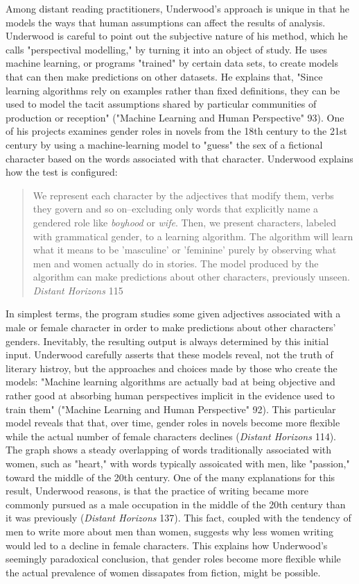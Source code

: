 \documentclass[11pt]{article}
\begin{document}
Among distant reading practitioners, Underwood's approach is unique in
that he models the ways that human assumptions can affect the results
of analysis. Underwood is careful to point out the subjective nature
of his method, which he calls "perspectival modelling," by turning it
into an object of study. He uses machine learning, or programs
"trained" by certain data sets, to create models that can then make
predictions on other datasets. He explains that, "Since learning
algorithms rely on examples rather than fixed definitions, they can be
used to model the tacit assumptions shared by particular communities
of production or reception" ("Machine Learning and Human Perspective"
93). One of his projects examines gender roles in novels from the
18th century to the 21st century by using a machine-learning model to
"guess" the sex of a fictional character based on the words associated
with that character. Underwood explains how the test is configured:
\begin{quote}
We represent each character by the adjectives that modify them, verbs
they govern and so on--excluding only words that explicitly name a
gendered role like \emph{boyhood} or \emph{wife}. Then, we present characters,
labeled with grammatical gender, to a learning algorithm. The
algorithm will learn what it means to be 'masculine' or 'feminine'
purely by observing what men and women actually do in stories. The
model produced by the algorithm can make predictions about other
characters, previously unseen. \emph{Distant Horizons} 115
\end{quote}
In simplest terms, the program studies some given adjectives
associated with a male or female character in order to make
predictions about other characters' genders. Inevitably, the resulting
output is always determined by this initial input. Underwood carefully
asserts that these models reveal, not the truth of literary histroy,
but the approaches and choices made by those who create the models:
"Machine learning algorithms are actually bad at being objective and
rather good at absorbing human perspectives implicit in the evidence
used to train them" ("Machine Learning and Human Perspective"
92). This particular model reveals that that, over time, gender roles
in novels become more flexible while the actual number of female
characters declines (\emph{Distant Horizons} 114). The graph shows a steady
overlapping of words traditionally associated with women, such as
"heart," with words typically assoicated with men, like "passion,"
toward the middle of the 20th century. One of the many explanations
for this result, Underwood reasons, is that the practice of writing
became more commonly pursued as a male occupation in the middle of the
20th century than it was previously (\emph{Distant Horizons} 137). This
fact, coupled with the tendency of men to write more about men than
women, suggests why less women writing would led to a decline in
female characters. This explains how Underwood's seemingly paradoxical conclusion, that gender roles become more flexible while the actual prevalence of women dissapates from fiction, might be possible.
\end{document}
